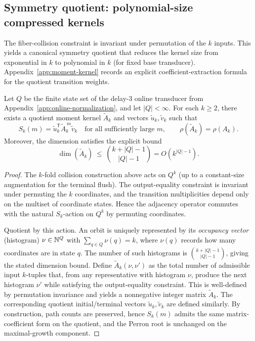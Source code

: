 \subsection{Symmetry quotient: polynomial-size compressed kernels}\label{subsec:symmetric-quotient}
The fiber-collision constraint is invariant under permutation of the $k$ inputs.
This yields a canonical symmetry quotient that reduces the kernel size from exponential in $k$ to polynomial in $k$ (for fixed base transducer).
Appendix~\ref{app:moment-kernel} records an explicit coefficient-extraction formula for the quotient transition weights.

\begin{proposition}\label{prop:moment-kernel-symmetric-compression}
Let $Q$ be the finite state set of the delay-$3$ online transducer from Appendix~\ref{app:online-normalization}, and let $|Q|<\infty$.
For each $k\ge 2$, there exists a quotient moment kernel $\widetilde A_k$ and vectors $\widetilde u_k,\widetilde v_k$ such that
\[
S_k(m)=\widetilde u_k^{\mathsf T}\widetilde A_k^{\,m}\widetilde v_k
\quad\text{for all sufficiently large $m$},
\qquad
\rho(\widetilde A_k)=\rho(A_k).
\]
Moreover, the dimension satisfies the explicit bound
\[
\dim(\widetilde A_k)\ \le\ \binom{k+|Q|-1}{|Q|-1}=O(k^{|Q|-1}).
\]
\end{proposition}

\begin{proof}
The $k$-fold collision construction above acts on $Q^k$ (up to a constant-size augmentation for the terminal flush).
The output-equality constraint is invariant under permuting the $k$ coordinates, and the transition multiplicities depend only on the multiset of coordinate states.
Hence the adjacency operator commutes with the natural $S_k$-action on $Q^k$ by permuting coordinates.
\par
Quotient by this action.
An orbit is uniquely represented by its \emph{occupancy vector} (histogram)
\(
\nu\in\mathbb{N}^{Q}
\)
with $\sum_{q\in Q}\nu(q)=k$, where $\nu(q)$ records how many coordinates are in state $q$.
The number of such histograms is $\binom{k+|Q|-1}{|Q|-1}$, giving the stated dimension bound.
Define $\widetilde A_k(\nu,\nu')$ as the total number of admissible input $k$-tuples that, from any representative with histogram $\nu$, produce the next histogram $\nu'$ while satisfying the output-equality constraint.
This is well-defined by permutation invariance and yields a nonnegative integer matrix $\widetilde A_k$.
The corresponding quotient initial/terminal vectors $\widetilde u_k,\widetilde v_k$ are defined similarly.
By construction, path counts are preserved, hence $S_k(m)$ admits the same matrix-coefficient form on the quotient, and the Perron root is unchanged on the maximal-growth component.
\end{proof}

